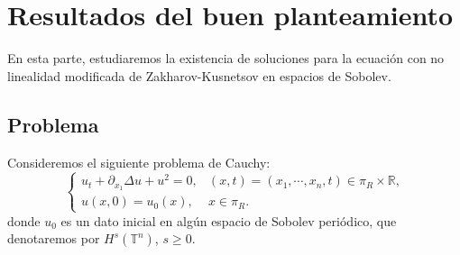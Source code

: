 \section{Resultados del buen planteamiento}\label{sec:buen-planteamiento}
  En esta parte, estudiaremos la existencia de soluciones para la ecuación con no linealidad modificada de Zakharov-Kusnetsov en espacios de Sobolev.
  \subsection{Problema}
    Consideremos el siguiente problema de Cauchy:
    \begin{equation}
      \begin{cases}
        u_t+\partial_{x_1}\Delta u+u^2=0, & (x,t)=(x_1,\cdots,x_n,t)\in \pi_R\times \mathbb{R} \text{,} \\
        u(x,0)=u_0(x), & x\in\pi_R.
      \end{cases}\label{eq:problema-de-cauchy}
    \end{equation}
    donde $u_0$ es un dato inicial en algún espacio de Sobolev periódico, que denotaremos por $H^s(\mathbb{T}^{n})$, $s \geq 0$.
